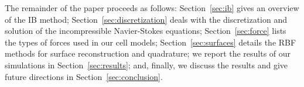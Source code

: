 The remainder of the paper proceeds as follows: Section~\ref{sec:ib} gives an overview of
the IB method; Section~\ref{sec:discretization} deals with the discretization and
solution of the incompressible Navier-Stokes equations; Section~\ref{sec:force} lists the
types of forces used in our cell models; Section~\ref{sec:surfaces} details the RBF
methods for surface reconstruction and quadrature; we report the results of our
simulations in Section~\ref{sec:results}; and, finally, we discuss the results and give
future directions in Section~\ref{sec:conclusion}.
